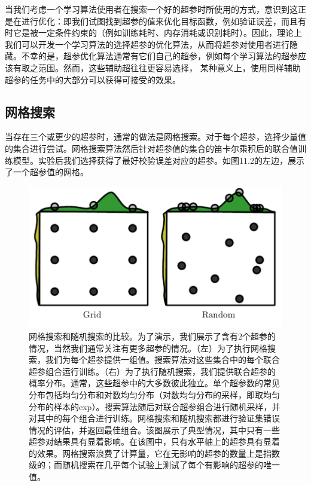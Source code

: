 当我们考虑一个学习算法使用者在搜索一个好的超参时所使用的方式，意识到这正是在进行优化：即我们试图找到超参的值来优化目标函数，例如验证误差，而且有时它是被一定条件约束的（例如训练耗时、内存消耗或识别耗时）。因此，理论上我们可以开发一个学习算法的选择超参的优化算法，从而将超参对使用者进行隐藏。不幸的是，超参优化算法通常有它们自己的超参，例如每个学习算法的超参应该有取之范围。然而，这些辅助超往往更容易选择， 某种意义上，使用同样辅助超参的任务中的大部分可以获得可接受的效果。

\subsection{ 网格搜索}
当存在三个或更少的超参时，通常的做法是网格搜索。对于每个超参，选择少量值的集合进行尝试。网格搜索算法然后针对超参值的集合的笛卡尔乘积后的联合值训练模型。实验后我们选择获得了最好校验误差对应的超参。如图11.2的左边，展示了一个超参值的网格。

\begin{figure}[htbp] %
   \centering
   \includegraphics[width=6in]{fig/chap11/11_2.png} 
   \caption{网格搜索和随机搜索的比较。为了演示，我们展示了含有2个超参的情况，当然我们通常关注有更多超参的情况。（左）为了执行网格搜索，我们为每个超参提供一组值。搜索算法对这些集合中的每个联合超参组合运行训练。（右）为了执行随机搜索，我们提供联合超参的概率分布。通常，这些超参中的大多数彼此独立。单个超参数的常见分布包括均匀分布和对数均匀分布（对数均匀分布的采样，即取均匀分布的样本的exp）。搜索算法随后对联合超参组合进行随机采样，并对其中的每个组合进行训练。网格搜索和随机搜索都进行验证集错误情况的评估，并返回最佳组合。该图展示了典型情况，其中只有一些超参对结果具有显着影响。在该图中，只有水平轴上的超参具有显着的效果。网格搜索浪费了计算量，它在无影响的超参的数量上是指数级的；而随机搜索在几乎每个试验上测试了每个有影响的超参的唯一值。}
   \label{fig:11_2}
\end{figure}

